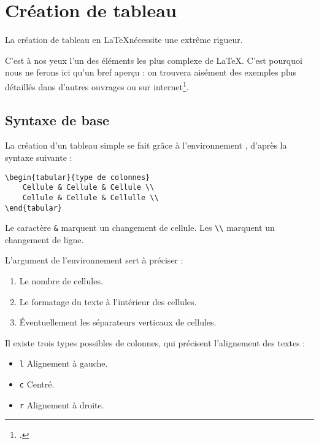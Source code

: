 \section{Création de tableau}

\begin{attention}
La création de tableau en \LaTeX nécessite  une extrême rigueur. 

C'est à nos yeux l'un des éléments les plus complexe de \LaTeX. C'est pourquoi nous ne ferons ici qu'un bref aperçu : on trouvera aisément des exemples plus détaillés dans d'autres ouvrages ou sur internet\footcite[On pourra consulter pour des fichiers assez didactiques :][]{bebert_tableaux}.

\end{attention}

\subsection{Syntaxe de base}

La création d'un tableau simple se fait grâce à l'environnement , d'après la syntaxe suivante :

\begin{verbatim}
\begin{tabular}{type de colonnes}
	Cellule & Cellule & Cellule \\
	Cellule & Cellule & Cellulle \\
\end{tabular}
\end{verbatim}

Le caractère \verb|&| marquent un changement de cellule. Les \verb|\\| marquent un changement de ligne.

L'argument  de l'environnement  sert à préciser :
\begin{enumerate}
	\item Le nombre de cellules.
	\item Le formatage du texte à l'intérieur des cellules.
	\item Éventuellement les séparateurs verticaux de cellules.
	
\end{enumerate}

Il existe trois types possibles de colonnes,  qui précisent l'alignement des textes : \label{typecolonnes}

\begin{itemize}
	\item \verb|l| Alignement à gauche.
	\item \verb|c| Centré.
	\item \verb|r| Alignement à droite.
\end{itemize}

